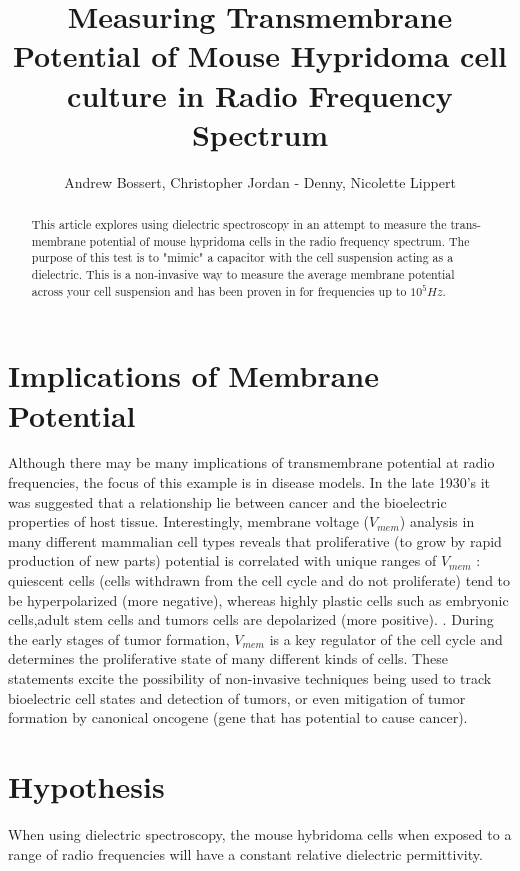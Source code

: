 \documentclass[journal]{IEEEtran}
\title{Measuring Transmembrane Potential of Mouse Hypridoma cell culture in Radio Frequency Spectrum}
\author{Andrew Bossert, Christopher Jordan - Denny, Nicolette Lippert}
\begin{document}
\maketitle


\begin{abstract}
This article explores using dielectric spectroscopy in an attempt to measure the trans-membrane potential of mouse hypridoma cells in the radio frequency spectrum. The purpose of this test is to "mimic" a capacitor with the cell suspension acting as a dielectric. This is a non-invasive way to measure the average membrane potential across your cell suspension and has been proven in \cite{Dielectric Spectroscopy} for frequencies up to \textbf{$10^5 Hz$}.
\end{abstract}

\section{Implications of Membrane Potential}
Although there may be many implications of transmembrane potential at radio frequencies, the focus of this example is in disease models. In the late 1930's it was suggested that a relationship lie between cancer and the bioelectric properties of host tissue. Interestingly, membrane voltage ($V_{mem}$) analysis in many different mammalian cell types reveals that proliferative (to grow by rapid production of new parts) potential is correlated with unique ranges of $V_{mem}$ : quiescent cells (cells withdrawn from the cell cycle and do not proliferate) tend to be hyperpolarized (more negative), whereas highly plastic cells such as embryonic cells,adult stem cells and tumors cells are depolarized (more positive). \cite{TMP-implications}. During the early stages of tumor formation, $V_{mem}$ is a key regulator of the cell cycle and determines the proliferative state of many different kinds of cells. These statements excite the possibility of non-invasive techniques being used to track bioelectric cell states and detection of tumors, or even mitigation of tumor formation by canonical oncogene (gene that has potential to cause cancer).

\section{Hypothesis}
When using dielectric spectroscopy, the mouse hybridoma cells when exposed to a range of radio frequencies will have a constant relative dielectric permittivity. 
\end{document}
